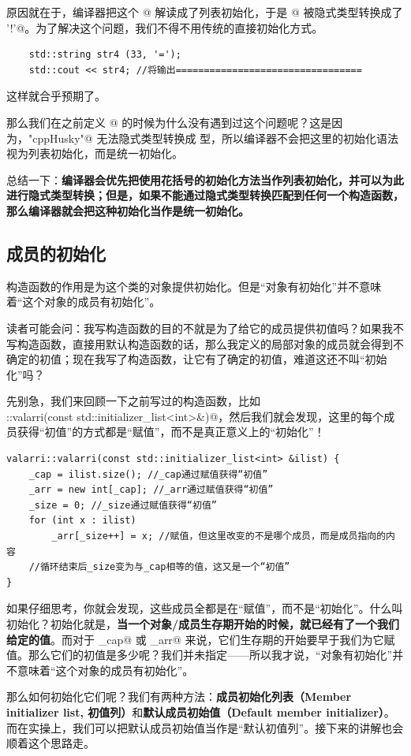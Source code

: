 原因就在于，编译器把这个 @ 解读成了列表初始化，于是 @ 被隐式类型转换成了 \lstinline@'!'@。为了解决这个问题，我们不得不用传统的直接初始化方式。
\begin{lstlisting}
    std::string str4 (33, '=');
    std::cout << str4; //将输出=================================
\end{lstlisting}
这样就合乎预期了。\par
那么我们在之前定义 @ 的时候为什么没有遇到过这个问题呢？这是因为，\lstinline@"cppHusky"@ 无法隐式类型转换成 \lstinline@char@ 型，所以编译器不会把这里的初始化语法视为列表初始化，而是统一初始化。\par
总结一下：\textbf{编译器会优先把使用花括号的初始化方法当作列表初始化，并可以为此进行隐式类型转换；但是，如果不能通过隐式类型转换匹配到任何一个构造函数，那么编译器就会把这种初始化当作是统一初始化。}\par
\subsection*{成员的初始化}
构造函数的作用是为这个类的对象提供初始化。但是``对象有初始化''并不意味着``这个对象的成员有初始化''。\par
读者可能会问：我写构造函数的目的不就是为了给它的成员提供初值吗？如果我不写构造函数，直接用默认构造函数的话，那么我定义的局部对象的成员就会得到不确定的初值；现在我写了构造函数，让它有了确定的初值，难道这还不叫``初始化''吗？\par
先别急，我们来回顾一下之前写过的构造函数，比如\\\lstinline@valarri::valarri(const std::initializer_list<int>&)@，然后我们就会发现，这里的每个成员获得``初值''的方式都是``赋值''，而不是真正意义上的``初始化''！
\begin{lstlisting}
valarri::valarri(const std::initializer_list<int> &ilist) {
    _cap = ilist.size(); //_cap通过赋值获得“初值”
    _arr = new int[_cap]; //_arr通过赋值获得“初值”
    _size = 0; //_size通过赋值获得“初值”
    for (int x : ilist)
        _arr[_size++] = x; //赋值，但这里改变的不是哪个成员，而是成员指向的内容
    //循环结束后_size变为与_cap相等的值，这又是一个“初值”
}
\end{lstlisting}
如果仔细思考，你就会发现，这些成员全都是在``赋值''，而不是``初始化''。什么叫初始化？初始化就是，\textbf{当一个对象/成员生存期开始的时候，就已经有了一个我们给定的值}。而对于 \lstinline@_cap@ 或 \lstinline@_arr@ 来说，它们生存期的开始要早于我们为它赋值。那么它们的初值是多少呢？我们并未指定——所以我才说，``对象有初始化''并不意味着``这个对象的成员有初始化''。\par
那么如何初始化它们呢？我们有两种方法：\textbf{成员初始化列表（Member initializer list, 初值列）}和\textbf{默认成员初始值（Default member initializer）}。而在实操上，我们可以把默认成员初始值当作是``默认初值列''。接下来的讲解也会顺着这个思路走。\par
